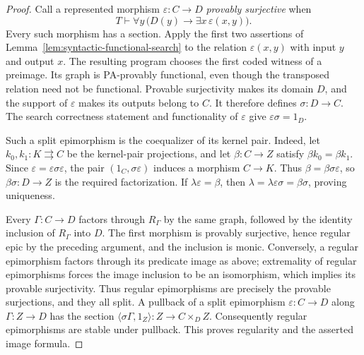 \begin{proof}
Call a represented morphism $\varepsilon:C\to D$
\emph{provably surjective} when
\[
 T\vdash\forall y\,
       \bigl(D(y)\longrightarrow\exists x\,\varepsilon(x,y)\bigr).
\]
Every such morphism has a section. Apply the first two assertions
of Lemma~\ref{lem:syntactic-functional-search} to the relation
$\varepsilon(x,y)$ with input $y$ and output $x$. The resulting
program chooses the first coded witness of a preimage. Its graph
is PA-provably functional, even though the transposed relation
need not be functional. Provable surjectivity makes its domain
$D$, and the support of $\varepsilon$ makes its outputs belong
to $C$. It therefore defines $\sigma:D\to C$. The search
correctness statement and functionality of $\varepsilon$ give
$\varepsilon\sigma=1_D$.

Such a split epimorphism is the coequalizer of its kernel pair.
Indeed, let $k_0,k_1:K\rightrightarrows C$ be the kernel-pair
projections, and let $\beta:C\to Z$ satisfy
$\beta k_0=\beta k_1$. Since
$\varepsilon=\varepsilon\sigma\varepsilon$, the pair
$(1_C,\sigma\varepsilon)$ induces a morphism $C\to K$.
Thus $\beta=\beta\sigma\varepsilon$, so
$\beta\sigma:D\to Z$ is the required factorization. If
$\lambda\varepsilon=\beta$, then
$\lambda=\lambda\varepsilon\sigma=\beta\sigma$, proving
uniqueness.

Every $\Gamma:C\to D$ factors through $R_\Gamma$ by the same
graph, followed by the identity inclusion of $R_\Gamma$ into $D$.
The first morphism is provably surjective, hence regular epic by
the preceding argument, and the inclusion is monic.
Conversely, a regular epimorphism factors through its predicate
image as above; extremality of regular epimorphisms forces the
image inclusion to be an isomorphism, which implies its provable
surjectivity. Thus regular epimorphisms are precisely the provable
surjections, and they all split. A pullback of a split epimorphism
$\varepsilon:C\to D$ along $\Gamma:Z\to D$ has the section
$\langle\sigma\Gamma,1_Z\rangle:Z\to C\times_D Z$.
Consequently regular epimorphisms are stable under pullback.
This proves regularity and the asserted image formula.


\end{proof}
